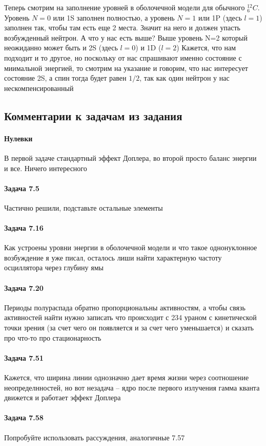\documentclass[12pt]{article}
\begin{document}
Теперь смотрим на заполнение уровней в оболочечной модели для обычного ${^{12}_6}C$. Уровень $N=0$ или 1S заполнен полностью, а уровень $N=1$ или 1P (здесь $l=1$) заполнен так, чтобы там есть еще 2 места. Значит на него и должен упасть возбужденный нейтрон. А что у нас есть выше? Выше уровень N=2 который неожиданно может быть и 2S (здесь $l=0$) и 1D ($l=2$) Кажется, что нам подходит и то другое, но поскольку от нас спрашивают именно состояние с миимальной энергией, то смотрим на указание и говорим, что нас интересует состояние 2S, а спин тогда будет равен $1/2$, так как один нейтрон у нас нескомпенсированный


\subsection{Комментарии к задачам из задания}
\paragraph{Нулевки} В первой задаче стандартный эффект Доплера, во второй просто баланс энергии и все. Ничего интересного
\paragraph{Задача 7.5} Частично решили, подставьте остальные элементы
\paragraph{Задача 7.16} Как устроены уровни энергии в оболочечной модели  и что такое однонуклонное возбуждение я уже писал, осталось лиши найти характерную частоту осциллятора через глубину ямы
\paragraph{Задача 7.20} Периоды полураспада обратно пропорциональны активностям, а чтобы связь активностей найти нужно записать что происходит с 234 ураном с кинетической точки зрения (за счет чего он появляется и за счет чего уменьшается) и сказать про что-то про стационарность
\paragraph{Задача 7.51} Кажется, что ширина линии однозначно дает время жизни через соотношение неопределнностей, но вот незадача -- ядро после первого излучения гамма кванта движется и работает эффект Доплера
\paragraph{Задача 7.58} Попробуйте использовать рассуждения, аналогичные 7.57
\end{document}

